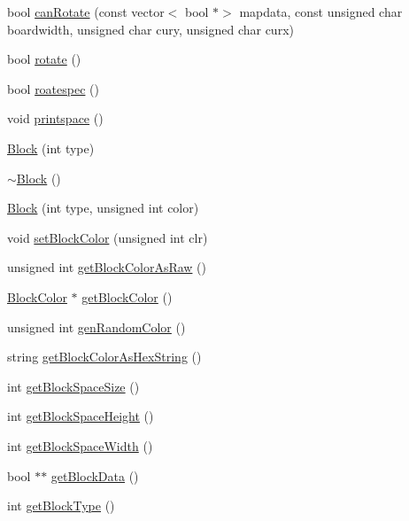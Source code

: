 \begin{DoxyCompactItemize}
bool \hyperlink{class_tetris_1_1_block_a56d194d0a5d56d2d1220ec32774cea38}{can\+Rotate} (const vector$<$ bool $\ast$$>$ mapdata, const unsigned char boardwidth, unsigned char cury, unsigned char curx)
\item 
bool \hyperlink{class_tetris_1_1_block_a0d1eb57e6da91832ad983f7a4fa9ca04}{rotate} ()
\item 
bool \hyperlink{class_tetris_1_1_block_a787424e5e9ec2807989121e8dcee1a7a}{roatespec} ()
\item 
void \hyperlink{class_tetris_1_1_block_ae7aadeec449fec232e9635d839593028}{printspace} ()
\item 
\hyperlink{class_tetris_1_1_block_a1fd0aaff1f4b622c9c7027929c5d4534}{Block} (int type)
\item 
\hyperlink{class_tetris_1_1_block_a20012167d55a996d56825d99082419c6}{$\sim$\+Block} ()
\item 
\hyperlink{class_tetris_1_1_block_a82c3ff96d106bd1da7b32f2addd7db7f}{Block} (int type, unsigned int color)
\item 
void \hyperlink{class_tetris_1_1_block_a1a3fab9e7eabe64a4ba588ed5091d3a9}{set\+Block\+Color} (unsigned int clr)
\item 
unsigned int \hyperlink{class_tetris_1_1_block_a8f6bd5020dcfdae501f74b42827344f3}{get\+Block\+Color\+As\+Raw} ()
\item 
\hyperlink{class_tetris_1_1_block_sub_modules_1_1_block_color}{Block\+Color} $\ast$ \hyperlink{class_tetris_1_1_block_ad61aea379870fbb3668d49e4c3c748ed}{get\+Block\+Color} ()
\item 
unsigned int \hyperlink{class_tetris_1_1_block_a4bae85cab786853cb3ff76aa7fe72edc}{gen\+Random\+Color} ()
\item 
string \hyperlink{class_tetris_1_1_block_a0adf3e3fbe9899115703913f18aaae6d}{get\+Block\+Color\+As\+Hex\+String} ()
\item 
int \hyperlink{class_tetris_1_1_block_a356cba210ff93bbd80c10d4d00c81cc2}{get\+Block\+Space\+Size} ()
\item 
int \hyperlink{class_tetris_1_1_block_a5301977e32c03aaf122fa289fcba77ba}{get\+Block\+Space\+Height} ()
\item 
int \hyperlink{class_tetris_1_1_block_ac390e14de476582300d815d9054ed9bd}{get\+Block\+Space\+Width} ()
\item 
bool $\ast$$\ast$ \hyperlink{class_tetris_1_1_block_a2e17230774c905e35aa9868986c49b09}{get\+Block\+Data} ()
\item 
int \hyperlink{class_tetris_1_1_block_a8780b7c5d836c3bb6bae3de5cdcba5e1}{get\+Block\+Type} ()

\end{DoxyCompactItemize}
